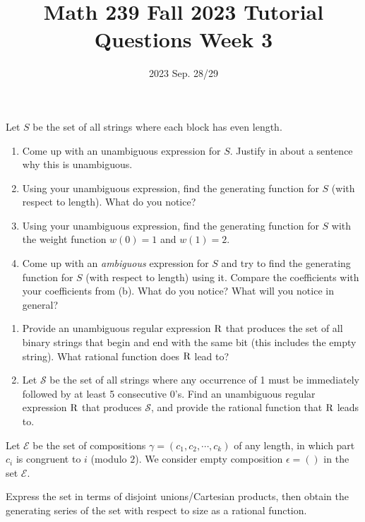 \title{Math 239 Fall 2023 Tutorial Questions Week 3}

\date{2023 Sep. 28/29}
\maketitle

\begin{enumerate}
     Let $S$ be the set of all strings where each block has even length.
    \begin{enumerate}
        \item Come up with an unambiguous expression for $S$. Justify in about a sentence why this is unambiguous.
        \item Using your unambiguous expression, find the generating function for $S$ (with respect to length). What do you notice?
        \item Using your unambiguous expression, find the generating function for $S$ with the weight function $w(0) = 1$ and $w(1) = 2$.
        \item Come up with an \textit{ambiguous} expression for $S$ and try to find the generating function for $S$ (with respect to length) using it. Compare the coefficients with your coefficients from (b). What do you notice? What will you notice in general?
    \end{enumerate}
    
    \begin{enumerate}
        \item Provide an unambiguous regular expression ${\rm R}$ that produces the set of all binary strings that begin and end with the same bit (this includes the empty string).  What rational function does ${\rm R}$ lead to? 
        \item Let $\mathcal{S}$ be the set of all strings where any occurrence of 1 must be immediately followed by at least 5 consecutive 0’s.  Find an unambiguous regular expression ${\rm R}$ that produces $\mathcal{S}$, and provide the rational function that ${\rm R}$ leads to.     \end{enumerate}
    
     Let $\mathcal{E}$ be the set of compositions $\gamma= (c_1, c_2, \cdots, c_k)$ of any length, in which part $c_i$ is congruent to $i$ (modulo $2$). We consider empty composition $\epsilon = ()$ in the set $\mathcal{E}$. 

    Express the set in terms of disjoint unions/Cartesian products, then obtain the generating series of the set with respect to size as a rational function.
    

\end{enumerate}
